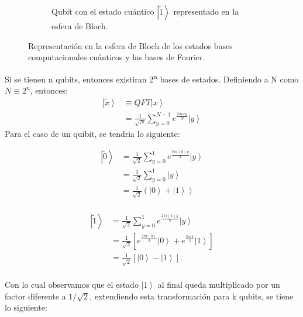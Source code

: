 \begin{figure}[H]
\begin{subfigure}{0.5\linewidth}
        \caption{Qubit con el estado cuántico $\left|\tilde{1} \right\rangle$ representado en la esfera de Bloch.}
    \end{subfigure}
\caption{Representación en la esfera de Bloch de los estados bases computacionales cuánticos y las bases de Fourier.}
\end{figure}
Si se tienen n qubits, entonces existiran 2\textsuperscript{n} bases de estados. Definiendo a N como $N\equiv 2^n$, entonces:
\begin{align*}
    \left|\tilde{x} \right\rangle &\equiv QFT\left| x \right\rangle\\
    &= \frac{1}{\sqrt{N}} \sum\limits_{y=0}^{N-1} e^{\frac{2\pi i x y}{N}} \left|y \right\rangle
\end{align*}
Para el caso de un quibit, se tendria lo siguiente:\\
\begin{minipage}{0.5\linewidth}
    \begin{align*}
        \left|\tilde{0} \right\rangle &= \frac{1}{\sqrt{2}} \sum\limits_{y=0}^1 e^{\frac{2\pi i (0)y}{2}} \left|y \right\rangle \\
        &= \frac{1}{\sqrt{2}} \sum\limits_{y=0}^1 \left|y \right\rangle \\
        &= \frac{1}{\sqrt{2}} \left(\left| 0\right\rangle + \left| 1\right\rangle \right) \\
    \end{align*}  
\end{minipage}
\begin{minipage}{0.5\linewidth}
    \begin{align*}
        \left| \tilde{1} \right\rangle & = \frac{1}{\sqrt{2}} \sum\limits_{y=0}^1 e^{\frac{2\pi i (1)y}{2}} \left|y \right\rangle \\
        &= \frac{1}{\sqrt{2}} \left[e^{\frac{2\pi i(0)}{2}}\left| 0\right\rangle+ e^{\frac{2  \pi i 1}{2}} \left|1 \right\rangle\right] \\
        &= \frac{1}{\sqrt{2}} \left[\left|0 \right\rangle-\left|1 \right\rangle \right].\\
    \end{align*}
\end{minipage}
Con lo cual observamos que el estado $\left| 1\right\rangle$ al final queda multiplicado por un factor diferente a $1/\sqrt{2}$, extendiendo esta transformación para
k qubits, se tiene lo siguiente:
